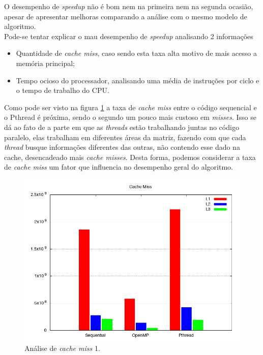 \documentclass[12pt]{article}
\newcommand\tab[1][1cm]{\hspace*{#1}}
\begin{document}
O desempenho de \textit{speedup} não é bom nem na primeira nem na segunda ocasião, apesar de apresentar melhoras comparando a análise com o mesmo modelo de algoritmo.
\\
\tab Pode-se tentar explicar o mau desempenho de \textit{speedup} analisando 2 informações
\begin{itemize}
\item Quantidade de \textit{cache miss}, caso sendo esta taxa alta motivo de mais acesso a memória principal;
\item{Tempo ocioso do processador}, analisando uma média de instruções por ciclo e o tempo de trabalho do CPU.
\end{itemize}
\tab Como pode ser visto na figura \ref{fig:cache} a taxa de \textit{cache miss} entre o código sequencial e o Pthread é próxima, sendo o segundo  um pouco mais custoso em \textit{misses}. Isso se dá ao fato de a parte em que as \textit{threads} estão trabalhando juntas no código paralelo, elas trabalham em diferentes áreas da matriz, fazendo com que cada \textit{thread} busque informações diferentes das outras, não contendo esse dado na cache, desencadeado mais \textit{cache misses}.
\tab Desta forma, podemos considerar a taxa de \textit{cache miss} um fator que influencia no desempenho geral do algoritmo.

\begin{figure}[ht]
\centering
\includegraphics[width=.5\textwidth]{cache.png}
\caption{Análise de \textit{cache miss} 1.}
\label{fig:cache}
\end{figure}
\end{document}
